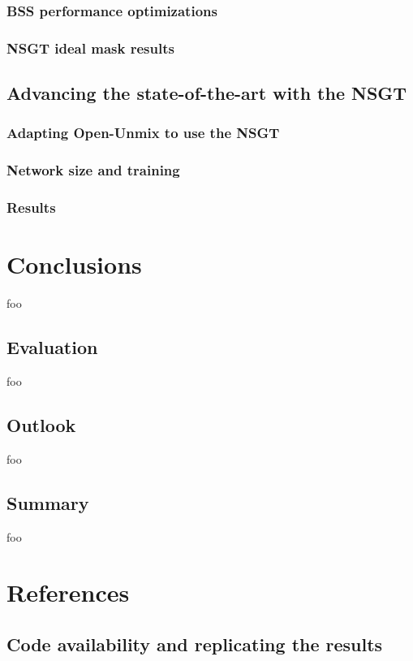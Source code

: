 \documentclass[letter,12pt,notitlepage]{article}
\begin{document}
\subsubsection{BSS performance optimizations}

\subsubsection{NSGT ideal mask results}

\subsection{Advancing the state-of-the-art with the NSGT}


\subsubsection{Adapting Open-Unmix to use the NSGT}

\subsubsection{Network size and training}

\subsubsection{Results}

\vfill
\clearpage

\section{Conclusions}
\label{sec:conclusion}

foo

\subsection{Evaluation}

foo

\subsection{Outlook}

foo

\subsection{Summary}

foo

\vfill
\clearpage %

\section{References}
\printbibliography[heading=none]

\vfill
\clearpage %

\begin{appendices}

\section{Code availability and replicating the results}
\label{appendix:coderesultsrepro}

\end{appendices}
\end{document}
